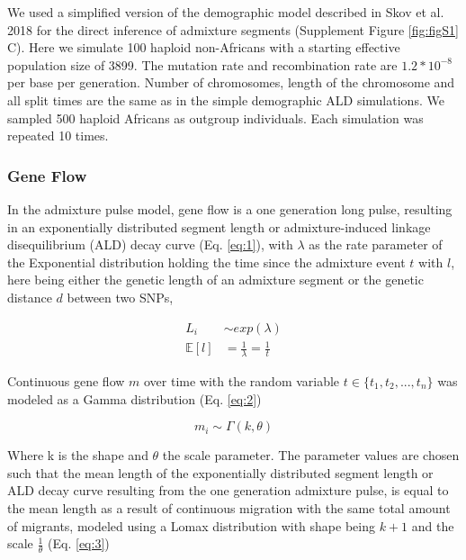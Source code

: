 \documentclass[]{article}
\begin{document}
We used a simplified version of the demographic model described in Skov et al. 2018 \citep{skov_detecting_2018} for the direct inference of admixture segments (Supplement Figure \ref{fig:figS1} C). Here we simulate 100 haploid non-Africans with a starting effective population size of 3899. The mutation rate and recombination rate are  \(1.2*10^{-8}\) per base per generation. Number of chromosomes, length of the chromosome and all split times are the same as in the simple demographic ALD simulations. We sampled 500 haploid Africans as outgroup individuals. Each simulation was repeated 10 times.

\subsubsection{Gene Flow}\label{gene flow}

In the admixture pulse model, gene flow is a one generation long pulse,
resulting in an exponentially distributed segment length or admixture-induced linkage
disequilibrium (ALD) decay curve (Eq. \ref{eq:1}), with $\lambda$ as
the rate parameter of the Exponential distribution holding the  time since the admixture event $t$ with $l$, here being either the genetic length of an admixture segment or the genetic
distance \(d\) between two SNPs,

\begin{equation}
\begin{split}
\label{eq:1}
L_i &\sim exp(\lambda) \\
\mathbb{E}[l] &= \frac{1}{\lambda} = \frac{1}{t}
\end{split}
\end{equation}

Continuous gene flow $m$ over time with the random variable $t \in \{t_1,t_2,...,t_n\}$ was modeled as a Gamma distribution (Eq.
\ref{eq:2})

\begin{equation}
\label{eq:2}
m_i \sim \Gamma(k,\theta)
\end{equation}

Where k is the shape and \(\theta\) the scale parameter. The parameter
values are chosen such that the mean length of the
exponentially distributed segment length or ALD decay curve resulting from the one
generation admixture pulse, is equal to the mean length as a result of continuous migration with the same total amount of
migrants, modeled using a Lomax distribution with shape being $k+1$ and the scale $\frac{1}{\theta}$ (Eq. \ref{eq:3})
\end{document}
